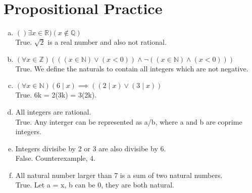 \documentclass{article}
\begin{document}
\part*{Propositional Practice}
    \begin{enumerate}[(a).]
        \item $()\exists x \in \mathbb{R})(x \notin \mathbb{Q})$\\
        True. $\sqrt{2}$ is a real number and also not rational.
        \item $(\forall x \in \mathbb{Z})(((x \in \mathbb{N}) \vee (x < 0)) \wedge
         \neg ((x \in \mathbb{N}) \wedge (x < 0)))$\\
        True. We define the naturals to contain all integers which are not negative.
        \item $(\forall x \in \mathbb{N})(6 \mid x) \implies ((2 \mid x) \vee (3 \mid x))$\\
        True. 6k = 2(3k) = 3(2k).
        \item All integers are rational.\\
        True. Any interger can be represented as a/b, where a and b are coprime integers.
        \item Integers divisibe by 2 or 3 are also divisibe by 6.\\
        False. Counterexample, 4.
        \item All natural number larger than 7 is a sum of two natural numbers.\\
        True. Let a = x, b can be 0, they are both natural.
        
    \end{enumerate}
\end{document}
